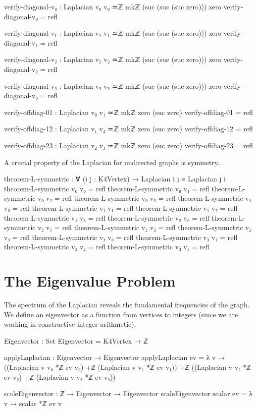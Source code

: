 \documentclass[11pt,a4paper]{book}
\begin{document}
\begin{code}
verify-diagonal-v₀ : Laplacian v₀ v₀ ≃ℤ mkℤ (suc (suc (suc zero))) zero
verify-diagonal-v₀ = refl

verify-diagonal-v₁ : Laplacian v₁ v₁ ≃ℤ mkℤ (suc (suc (suc zero))) zero
verify-diagonal-v₁ = refl

verify-diagonal-v₂ : Laplacian v₂ v₂ ≃ℤ mkℤ (suc (suc (suc zero))) zero
verify-diagonal-v₂ = refl

verify-diagonal-v₃ : Laplacian v₃ v₃ ≃ℤ mkℤ (suc (suc (suc zero))) zero
verify-diagonal-v₃ = refl

verify-offdiag-01 : Laplacian v₀ v₁ ≃ℤ mkℤ zero (suc zero)
verify-offdiag-01 = refl

verify-offdiag-12 : Laplacian v₁ v₂ ≃ℤ mkℤ zero (suc zero)
verify-offdiag-12 = refl

verify-offdiag-23 : Laplacian v₂ v₃ ≃ℤ mkℤ zero (suc zero)
verify-offdiag-23 = refl

\end{code}

A crucial property of the Laplacian for undirected graphs is symmetry.

\begin{code}
theorem-L-symmetric : ∀ (i j : K4Vertex) → Laplacian i j ≡ Laplacian j i
theorem-L-symmetric v₀ v₀ = refl
theorem-L-symmetric v₀ v₁ = refl
theorem-L-symmetric v₀ v₂ = refl
theorem-L-symmetric v₀ v₃ = refl
theorem-L-symmetric v₁ v₀ = refl
theorem-L-symmetric v₁ v₁ = refl
theorem-L-symmetric v₁ v₂ = refl
theorem-L-symmetric v₁ v₃ = refl
theorem-L-symmetric v₂ v₀ = refl
theorem-L-symmetric v₂ v₁ = refl
theorem-L-symmetric v₂ v₂ = refl
theorem-L-symmetric v₂ v₃ = refl
theorem-L-symmetric v₃ v₀ = refl
theorem-L-symmetric v₃ v₁ = refl
theorem-L-symmetric v₃ v₂ = refl
theorem-L-symmetric v₃ v₃ = refl
\end{code}

\section{The Eigenvalue Problem}

The spectrum of the Laplacian reveals the fundamental frequencies of the graph. We define an eigenvector as a function from vertices to integers (since we are working in constructive integer arithmetic).

\begin{code}
Eigenvector : Set
Eigenvector = K4Vertex → ℤ

applyLaplacian : Eigenvector → Eigenvector
applyLaplacian ev = λ v → 
  ((Laplacian v v₀ *ℤ ev v₀) +ℤ (Laplacian v v₁ *ℤ ev v₁)) +ℤ 
  ((Laplacian v v₂ *ℤ ev v₂) +ℤ (Laplacian v v₃ *ℤ ev v₃))

scaleEigenvector : ℤ → Eigenvector → Eigenvector
scaleEigenvector scalar ev = λ v → scalar *ℤ ev v
\end{code}
\end{document}
